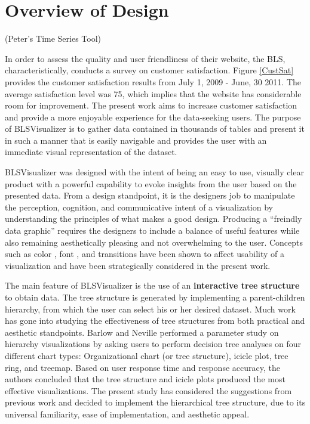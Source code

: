 \documentclass{sigchi}
\newcommand\Peter[1]{{\color{red}#1}}	%
\begin{document}
\Peter{\section{Overview of Design}}

(Peter's Time Series Tool)

\Peter{In order to assess the quality and user friendliness of their website, the BLS, characteristically, conducts a survey on customer satisfaction. Figure \ref{CustSat} provides the customer satisfaction results from July 1, 2009 - June, 30 2011. The average satisfaction level was 75, which implies that the website has considerable room for improvement. The present work aims to increase customer satisfaction and provide a more enjoyable experience for the data-seeking users. The purpose of BLSVisualizer is to gather data contained in thousands of tables and present it in such a manner that is easily navigable and provides the user with an immediate visual representation of the dataset.

BLSVisualizer was designed with the intent of being an easy to use, visually clear product with a powerful capability to evoke insights from the user based on the presented data. From a design standpoint, it is the designers job to manipulate the perception, cognition, and communicative intent of a visualization \cite{Agrawala2011} by understanding the principles of what makes a good design. Producing a ``freindly data graphic'' \cite{Tufte} requires the designers to include a balance of useful features while also remaining aesthetically pleasing and not overwhelming to the user. Concepts such as color \cite{MacDonald1999}, font \cite{Moere2011}, and transitions \cite{Heer2007} have been shown to affect usability of a visualization and have been strategically considered in the present work.

The main feature of BLSVisualizer is the use of an \textbf{interactive tree structure} to obtain data. The tree structure is generated by implementing a parent-children hierarchy, from which the user can select his or her desired dataset. Much work has gone into studying the effectiveness of tree structures from both practical \cite{Barlow2001} and aesthetic \cite{Wetherell1979, Reingold1981} standpoints. Barlow and Neville performed a parameter study on hierarchy visualizations by asking users to perform decision tree analyses on four different chart types: Organizational chart (or tree structure), icicle plot, tree ring, and treemap. Based on user response time and response accuracy, the authors concluded that the tree structure and icicle plots produced the most effective visualizations. The present study has considered the suggestions from previous work and decided to implement the hierarchical tree structure, due to its universal familiarity, ease of implementation, and aesthetic appeal.

}
\end{document}
